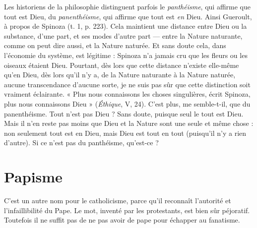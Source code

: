 Les historiens de la philosophie distinguent parfois le {\it panthéisme}, qui
affirme que tout est Dieu, du {\it panenthéisme}, qui affirme que tout est {\it en} Dieu.
Ainsi Gueroult, à propos de Spinoza (t. 1, p. 223). Cela maintient une distance
entre Dieu ou la substance, d’une part, et ses modes d’autre part — entre la
Nature naturante, comme on peut dire aussi, et la Nature naturée. Et sans
doute cela, dans l’économie du système, est légitime : Spinoza n’a jamais cru
que les fleurs ou les oiseaux étaient Dieu. Pourtant, dès lors que cette distance
n’existe elle-même qu’en Dieu, dès lors qu’il n’y a, de la Nature naturante à la
Nature naturée, aucune transcendance d’aucune sorte, je ne suis pas sûr que
cette distinction soit vraiment éclairante. « Plus nous connaissons les choses
singulières, écrit Spinoza, plus nous connaissons Dieu » ({\it Éthique}, V, 24). C’est
plus, me semble-t-il, que du panenthéisme. Tout n’est pas Dieu ? Sans doute,
puisque seul le tout est Dieu. Mais il n’en reste pas moins que Dieu et la
Nature sont une seule et même chose : non seulement tout est en Dieu, mais
Dieu est tout en tout (puisqu'il n’y a rien d’autre). Si ce n’est pas du panthéisme,
qu'est-ce ?

\section{Papisme}
C’est un autre nom pour le catholicisme, parce qu’il reconnaît
l'autorité et l’infaillibilité du Pape. Le mot, inventé par les protestants,
est bien sûr péjoratif. Toutefois il ne suffit pas de ne pas avoir de pape
pour échapper au fanatisme.

